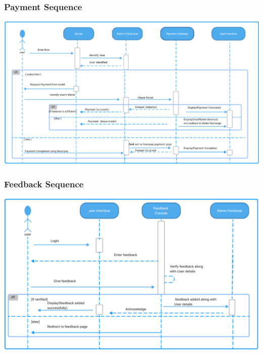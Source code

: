 \documentclass[11pt]{article}
\begin{document}
\subsubsection{Payment Sequence}
\begin{center}
  \includegraphics[scale=0.28]{sequence-diagram-images/payment.png}
\end{center}

\subsubsection{Feedback Sequence}
\begin{center}
  \includegraphics[scale=0.35]{sequence-diagram-images/feedback.png}
\end{center}
\end{document}
